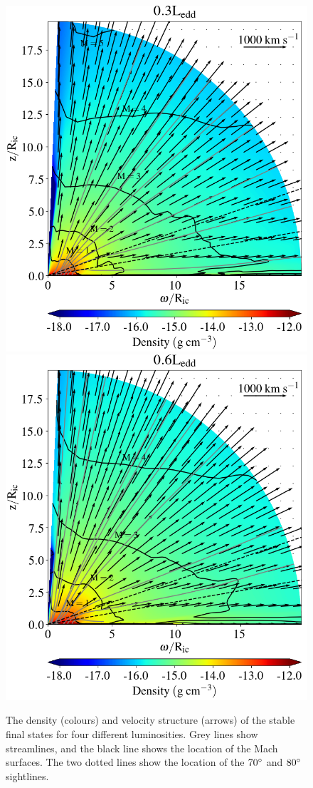 \documentclass[a4paper,fleqn,usenatbib]{mnras}
\begin{document}
\begin{figure}
\includegraphics[width=\columnwidth]{figures/fig3c_density.png}
\includegraphics[width=\columnwidth]{figures/fig3d_density.png}
\caption{The density (colours) and velocity structure (arrows) of the stable final states for 
four different luminosities. Grey lines show streamlines, and the black line shows the location of the Mach surfaces. The two dotted
lines show the location of the $70\degree$ and $80\degree$ sightlines.}
\label{figure:wind_small_image}
\end{figure}
\end{document}
